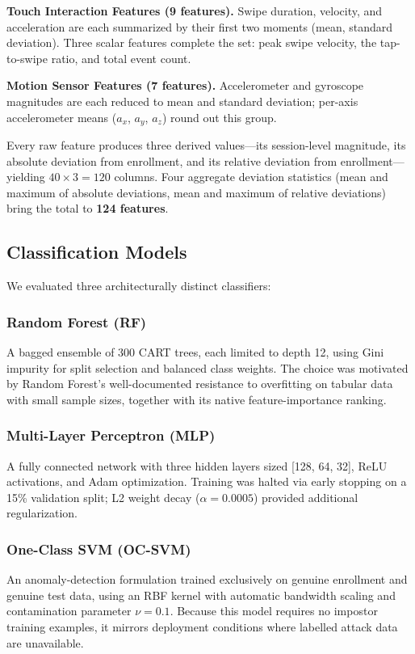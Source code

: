 \documentclass[conference]{IEEEtran}
\begin{document}
\textbf{Touch Interaction Features (9 features).} Swipe duration, velocity, and acceleration are each summarized by their first two moments (mean, standard deviation). Three scalar features complete the set: peak swipe velocity, the tap-to-swipe ratio, and total event count.

\textbf{Motion Sensor Features (7 features).} Accelerometer and gyroscope magnitudes are each reduced to mean and standard deviation; per-axis accelerometer means ($a_x$, $a_y$, $a_z$) round out this group.

Every raw feature produces three derived values---its session-level magnitude, its absolute deviation from enrollment, and its relative deviation from enrollment---yielding $40 \times 3 = 120$ columns. Four aggregate deviation statistics (mean and maximum of absolute deviations, mean and maximum of relative deviations) bring the total to \textbf{124 features}.

\subsection{Classification Models}
We evaluated three architecturally distinct classifiers:

\subsubsection{Random Forest (RF)}
A bagged ensemble of 300 CART trees, each limited to depth 12, using Gini impurity for split selection and balanced class weights. The choice was motivated by Random Forest's well-documented resistance to overfitting on tabular data with small sample sizes, together with its native feature-importance ranking.

\subsubsection{Multi-Layer Perceptron (MLP)}
A fully connected network with three hidden layers sized [128, 64, 32], ReLU activations, and Adam optimization. Training was halted via early stopping on a 15\% validation split; L2 weight decay ($\alpha = 0.0005$) provided additional regularization.

\subsubsection{One-Class SVM (OC-SVM)}
An anomaly-detection formulation trained exclusively on genuine enrollment and genuine test data, using an RBF kernel with automatic bandwidth scaling and contamination parameter $\nu = 0.1$. Because this model requires no impostor training examples, it mirrors deployment conditions where labelled attack data are unavailable.
\end{document}
